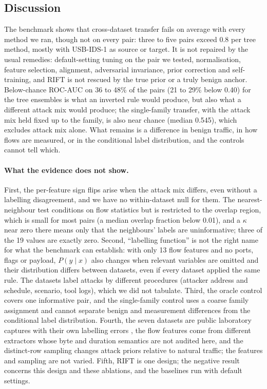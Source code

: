 \documentclass[pdflatex,sn-mathphys-num]{sn-jnl}%
\begin{document}
\subsection{Discussion}
The benchmark shows that cross-dataset transfer fails on average with every method we ran, though not on every pair: three to five pairs exceed 0.8 per tree method, mostly with USB-IDS-1 as source or target.
It is not repaired by the usual remedies: default-setting tuning on the pair we tested, normalisation, feature selection, alignment, adversarial invariance, prior correction and self-training, and RIFT is not rescued by the true prior or a truly benign anchor.
Below-chance ROC-AUC on 36 to 48\% of the pairs (21 to 29\% below 0.40) for the tree ensembles is what an inverted rule would produce, but also what a different attack mix would produce; the single-family transfer, with the attack mix held fixed up to the family, is also near chance (median 0.545), which excludes attack mix alone.
What remains is a difference in benign traffic, in how flows are measured, or in the conditional label distribution, and the controls cannot tell which.

\paragraph{What the evidence does not show.}
First, the per-feature sign flips arise when the attack mix differs, even without a labelling disagreement, and we have no within-dataset null for them.
The nearest-neighbour test conditions on flow statistics but is restricted to the overlap region, which is small for most pairs (a median overlap fraction below 0.01), and a $\kappa$ near zero there means only that the neighbours' labels are uninformative; three of the 19 values are exactly zero.
Second, ``labelling function'' is not the right name for what the benchmark can establish: with only 13 flow features and no ports, flags or payload, $P(y\mid x)$ also changes when relevant variables are omitted and their distribution differs between datasets, even if every dataset applied the same rule.
The datasets label attacks by different procedures (attacker address and schedule, scenario, tool logs), which we did not tabulate.
Third, the oracle control covers one informative pair, and the single-family control uses a coarse family assignment and cannot separate benign and measurement differences from the conditional label distribution.
Fourth, the seven datasets are public laboratory captures with their own labelling errors \citep{engelen2021troubleshooting}, the flow features come from different extractors whose byte and duration semantics are not audited here, and the distinct-row sampling changes attack priors relative to natural traffic; the features and sampling are not varied.
Fifth, RIFT is one design; the negative result concerns this design and these ablations, and the baselines run with default settings.
\end{document}
